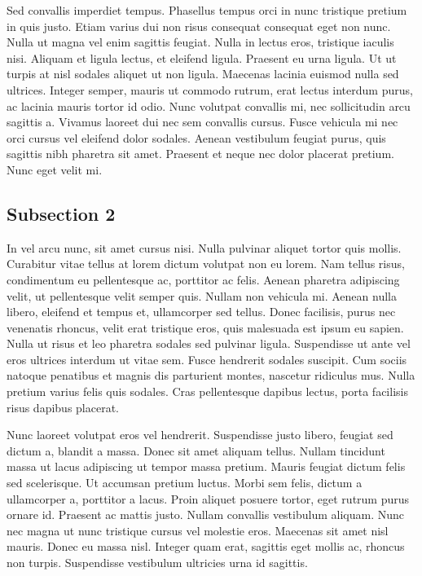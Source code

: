 Sed convallis imperdiet tempus. Phasellus tempus orci in nunc tristique pretium in quis justo. Etiam varius dui non
risus consequat consequat eget non nunc. Nulla ut magna vel enim sagittis feugiat. Nulla in lectus eros, tristique
iaculis nisi. Aliquam et ligula lectus, et eleifend ligula. Praesent eu urna ligula. Ut ut turpis at nisl sodales
aliquet ut non ligula. Maecenas lacinia euismod nulla sed ultrices. Integer semper, mauris ut commodo rutrum, erat
lectus interdum purus, ac lacinia mauris tortor id odio. Nunc volutpat convallis mi, nec sollicitudin arcu sagittis a.
Vivamus laoreet dui nec sem convallis cursus. Fusce vehicula mi nec orci cursus vel eleifend dolor sodales. Aenean
vestibulum feugiat purus, quis sagittis nibh pharetra sit amet. Praesent et neque nec dolor placerat pretium. Nunc eget
velit mi.

\subsection{Subsection 2}

In vel arcu nunc, sit amet cursus nisi. Nulla pulvinar aliquet tortor quis mollis. Curabitur vitae tellus at lorem
dictum volutpat non eu lorem. Nam tellus risus, condimentum eu pellentesque ac, porttitor ac felis. Aenean pharetra
adipiscing velit, ut pellentesque velit semper quis. Nullam non vehicula mi. Aenean nulla libero, eleifend et tempus et,
ullamcorper sed tellus. Donec facilisis, purus nec venenatis rhoncus, velit erat tristique eros, quis malesuada est
ipsum eu sapien. Nulla ut risus et leo pharetra sodales sed pulvinar ligula. Suspendisse ut ante vel eros ultrices
interdum ut vitae sem. Fusce hendrerit sodales suscipit. Cum sociis natoque penatibus et magnis dis parturient montes,
nascetur ridiculus mus. Nulla pretium varius felis quis sodales. Cras pellentesque dapibus lectus, porta facilisis risus
dapibus placerat.

Nunc laoreet volutpat eros vel hendrerit. Suspendisse justo libero, feugiat sed dictum a, blandit a massa. Donec sit
amet aliquam tellus. Nullam tincidunt massa ut lacus adipiscing ut tempor massa pretium. Mauris feugiat dictum felis sed
scelerisque. Ut accumsan pretium luctus. Morbi sem felis, dictum a ullamcorper a, porttitor a lacus. Proin aliquet
posuere tortor, eget rutrum purus ornare id. Praesent ac mattis justo. Nullam convallis vestibulum aliquam. Nunc nec
magna ut nunc tristique cursus vel molestie eros. Maecenas sit amet nisl mauris. Donec eu massa nisl. Integer quam erat,
sagittis eget mollis ac, rhoncus non turpis. Suspendisse vestibulum ultricies urna id sagittis.

